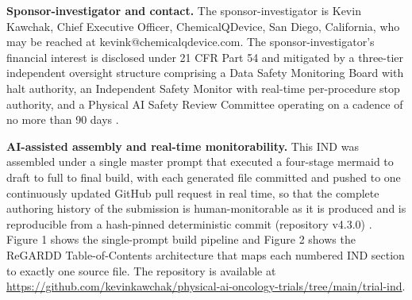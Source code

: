 \noindent\textbf{Sponsor-investigator and contact.} The sponsor-investigator is Kevin Kawchak, Chief Executive Officer, ChemicalQDevice, San Diego, California, who may be reached at kevink@chemicalqdevice.com. The sponsor-investigator's financial interest is disclosed under 21 CFR Part 54 and mitigated by a three-tier independent oversight structure comprising a Data Safety Monitoring Board with halt authority, an Independent Safety Monitor with real-time per-procedure stop authority, and a Physical AI Safety Review Committee operating on a cadence of no more than 90 days \cite{paisitedocpk}.

\noindent\textbf{AI-assisted assembly and real-time monitorability.} This IND was assembled under a single master prompt that executed a four-stage mermaid to draft to full to final build, with each generated file committed and pushed to one continuously updated GitHub pull request in real time, so that the complete authoring history of the submission is human-monitorable as it is produced and is reproducible from a hash-pinned deterministic commit (repository v4.3.0) \cite{oncotrialllm,natlpaiplatf}. Figure 1 shows the single-prompt build pipeline and Figure 2 shows the ReGARDD Table-of-Contents architecture that maps each numbered IND section to exactly one source file. The repository is available at \url{https://github.com/kevinkawchak/physical-ai-oncology-trials/tree/main/trial-ind}.

